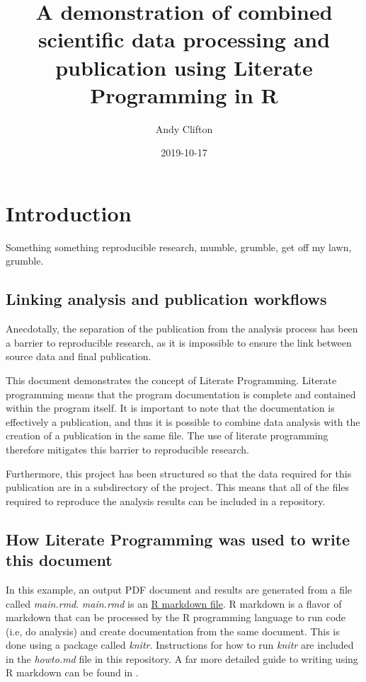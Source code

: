 \documentclass[10pt,]{article}
\title{A demonstration of combined scientific data processing and publication using Literate Programming in R}
\author{Andy Clifton}
\date{2019-10-17}
\begin{document}
\maketitle

{
\hypersetup{linkcolor=black}
\setcounter{tocdepth}{2}
\tableofcontents
}
\hypertarget{introduction}{%
\section{Introduction}\label{introduction}}

Something something reproducible research, mumble, grumble, get off my lawn, grumble.

\hypertarget{linking-analysis-and-publication-workflows}{%
\subsection{Linking analysis and publication workflows}\label{linking-analysis-and-publication-workflows}}

Anecdotally, the separation of the publication from the analysis process has been a barrier to reproducible research, as it is impossible to ensure the link between source data and final publication.

This document demonstrates the concept of Literate Programming. Literate programming means that the program documentation is complete and contained within the program itself. It is important to note that the documentation is effectively a publication, and thus it is possible to combine data analysis with the creation of a publication in the same file. The use of literate programming therefore mitigates this barrier to reproducible research.

Furthermore, this project has been structured so that the data required for this publication are in a subdirectory of the project. This means that all of the files required to reproduce the analysis results can be included in a repository.

\hypertarget{how-literate-programming-was-used-to-write-this-document}{%
\subsection{How Literate Programming was used to write this document}\label{how-literate-programming-was-used-to-write-this-document}}

In this example, an output PDF document and results are generated from a file called \emph{main.rmd}. \emph{main.rmd} is an \href{https://rmarkdown.rstudio.com/authoring_basics.html}{R markdown file}. R markdown is a flavor of markdown that can be processed by the R programming language \citep{R-base} to run code (i.e, do analysis) and create documentation from the same document. This is done using a package called \emph{knitr}. Instructions for how to run \emph{knitr} are included in the \emph{howto.md} file in this repository. A far more detailed guide to writing using R markdown can be found in \citet{R-Markdown-Guide}.
\end{document}
